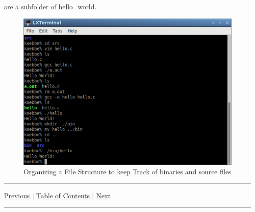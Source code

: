 \documentclass[10pt,fleqn]{article}
\begin{document}
are a subfolder of hello\_world.
\vfill
\begin{figure}[h]
\centering
\includegraphics[width=5.0in]{../images/hello_world_10.png}
\caption{Organizing a File Structure to keep Track of binaries and source files}
\end{figure}
\vskip0.1in\hrule\vskip0.1in \noindent
  \href{../../topic_05/md/topic_05.md}{Previous} |
  \href{../../toc/md/topic_toc.md}{Table of Contents} |
  \href{../../topic_07/md/topic_07.md}{Next}
\vskip0.1in\hrule\vskip0.1in \noindent
\end{document}
